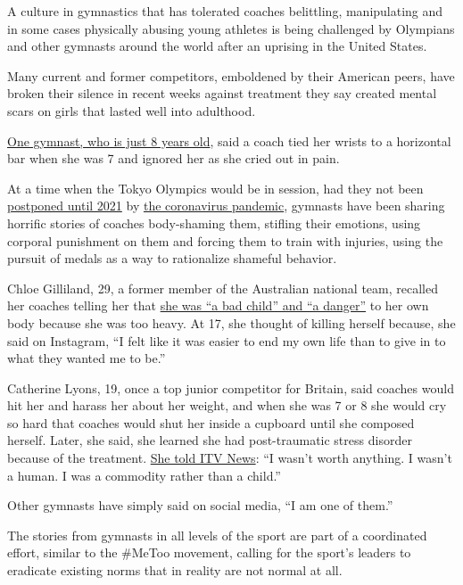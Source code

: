 A culture in gymnastics that has tolerated coaches belittling,
manipulating and in some cases physically abusing young athletes is
being challenged by Olympians and other gymnasts around the world after
an uprising in the United States.

Many current and former competitors, emboldened by their American peers,
have broken their silence in recent weeks against treatment they say
created mental scars on girls that lasted well into adulthood.

\href{https://www.itv.com/news/2020-07-07/girl-8-describes-bullying-by-gymnastics-coaches-as-review-is-pledged}{One
gymnast, who is just 8 years old}, said a coach tied her wrists to a
horizontal bar when she was 7 and ignored her as she cried out in pain.

At a time when the Tokyo Olympics would be in session, had they not been
\href{https://www.nytimes.com/2020/03/24/sports/olympics/coronavirus-summer-olympics-postponed.html}{postponed
until 2021} by \href{https://www.nytimes.com/news-event/coronavirus}{the
coronavirus pandemic}, gymnasts have been sharing horrific stories of
coaches body-shaming them, stifling their emotions, using corporal
punishment on them and forcing them to train with injuries, using the
pursuit of medals as a way to rationalize shameful behavior.

Chloe Gilliland, 29, a former member of the Australian national team,
recalled her coaches telling her that
\href{https://7news.com.au/sport/gymnastics/how-fat-shaming-drove-aussie-gymnast-to-breaking-point-c-1186590}{she
was ``a bad child'' and ``a danger''} to her own body because she was
too heavy. At 17, she thought of killing herself because, she said on
Instagram, ``I felt like it was easier to end my own life than to give
in to what they wanted me to be.''

Catherine Lyons, 19, once a top junior competitor for Britain, said
coaches would hit her and harass her about her weight, and when she was
7 or 8 she would cry so hard that coaches would shut her inside a
cupboard until she composed herself. Later, she said, she learned she
had post-traumatic stress disorder because of the treatment.
\href{https://www.itv.com/news/2020-07-22/truth-gives-power-to-abused-gymnasts}{She
told ITV News}: ``I wasn't worth anything. I wasn't a human. I was a
commodity rather than a child.''

Other gymnasts have simply said on social media, ``I am one of them.''

The stories from gymnasts in all levels of the sport are part of a
coordinated effort, similar to the \#MeToo movement, calling for the
sport's leaders to eradicate existing norms that in reality are not
normal at all.

